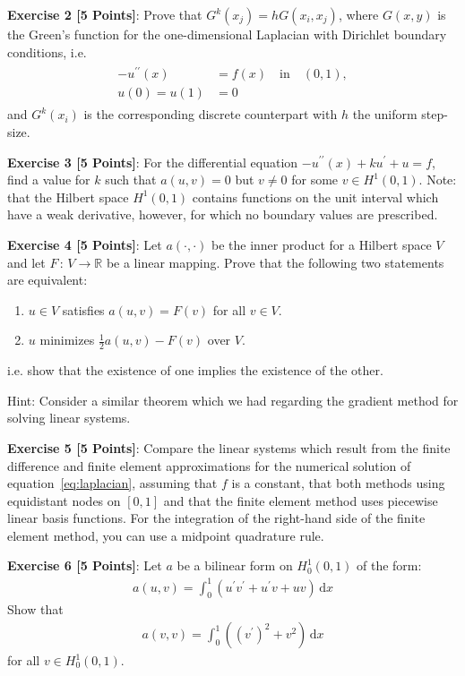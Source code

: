 \documentclass{article}
\begin{document}
\vspace{\baselineskip}
\noindent\textsf{\textbf{Exercise 2 [5 Points]}}: Prove that $G^k\left( x_j \right) = h G\left(x_i, x_j\right)$, where $G\left(x,y\right)$ is the Green's function for the one-dimensional Laplacian with Dirichlet boundary conditions, i.e. 
\begin{align}
\label{eq:laplacian}
\begin{split}
- u^{\prime\prime}\left(x\right) & = f\left(x\right) \quad \mbox{in} \quad(0,1), \\
u(0) = u(1) & = 0 
\end{split}
\end{align}
and $G^k\left(x_i\right)$ is the corresponding discrete counterpart with $h$ the uniform step-size.

\vspace{\baselineskip}
\noindent\textsf{\textbf{Exercise 3 [5 Points]}}: For the differential equation ${- u^{\prime\prime}\left(x\right) + k u^{\prime} + u = f}$, find a value for $k$ such that ${a\left(u,v\right)=0}$ but ${v \ne 0}$ for some ${v \in H^1(0,1)}$. 
Note: that the Hilbert space $H^1(0,1)$ contains functions on the unit interval which have a weak derivative, however, for which no boundary values are prescribed.

\vspace{\baselineskip}
\noindent\textsf{\textbf{Exercise 4 [5 Points]}}: Let $a\left( \cdot, \cdot \right)$ be the inner product for a Hilbert space $V$ and let $F \, : \, V \rightarrow \mathbb{R}$ be a linear mapping. Prove that the following two statements are equivalent:
\begin{enumerate}
\item $u \in V$ satisfies $a(u,v) = F(v)$ for all $v \in V$.
\item $u$ minimizes $\frac{1}{2}a(u,v) - F(v)$ over $V$.
\end{enumerate}
i.e. show that the existence of one implies the existence of the other.

Hint: Consider a similar theorem which we had regarding the gradient method for solving linear systems.

\vspace{\baselineskip}
\noindent\textsf{\textbf{Exercise 5 [5 Points]}}: Compare the linear systems which result from the finite difference and finite element approximations for the numerical solution of equation~\ref{eq:laplacian}, assuming that $f$ is a constant, that both methods using equidistant nodes on $[0,1]$ and that the finite element method uses piecewise linear basis functions. For the integration of the right-hand side of the finite element method, you can use a midpoint quadrature rule.

\vspace{\baselineskip}
\noindent\textsf{\textbf{Exercise 6 [5 Points]}}: Let $a$ be a bilinear form on $H^1_0(0,1)$ of the form:
\begin{align*}
a(u,v) = \int_0^1 \left( u^\prime v^\prime + u^\prime v + uv \right) \, \mathrm{d}x
\end{align*} 
Show that 
\begin{align*}
a(v,v) = \int_0^1 \left( \left(v^\prime\right)^2 + v^2 \right) \,\mathrm{d}x
\end{align*} 
for all $v \in H_0^1(0,1)$.
\end{document}
